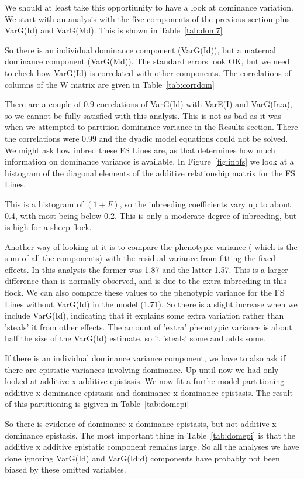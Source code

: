 \documentclass[titlepage]{article}  %
\begin{document}
We should at least take this opportiunity to have a look at dominance variation. We start with an analysis with the five components of the previous section plus VarG(Id) and VarG(Md). This is shown in Table~\ref{tab:dom7}

So there is an individual dominance component (VarG(Id)), but a maternal dominance component (VarG(Md)). The standard errors look OK, but we need to check how VarG(Id) is correlated with other components. The correlations of columns of the W matrix are given in Table~\ref{tab:corrdom}

There are a couple of 0.9 correlations of VarG(Id) with VarE(I) and  VarG(Ia:a), so we cannot be fully satisfied with this analysis. This is not as bad as it was when we attempted to partition dominance variance in the Results section. There the correlations were 0.99 and the dyadic model equations could not be solved.
We might ask how inbred these FS Lines are, as that determines how much information on dominance variance is available. In Figure~\ref{fig:inbfs} we look at a histogram of the diagonal elements of the additive relationship matrix for the FS Lines. 

This is a histogram of $(1 + F)$, so the inbreeding coefficients vary up to about 0.4, with most being below 0.2. This is only a moderate degree of inbreeding, but is high for a sheep flock.

Another way of looking at it is to compare the phenotypic variance ( which is the sum of all the components) with the residual variance from fitting the fixed effects. In this analysis the former was 1.87 and the latter 1.57. This is a larger difference than is normally observed, and is due to the extra inbreeding in this flock. We can also compare these values to the phenotypic variance for the FS Lines without VarG(Id) in the model (1.71). So there is a slight increase when we include VarG(Id), indicating that it explains some extra variation rather than 'steals' it from other effects. The amount of 'extra' phenotypic variance is about half the size of the VarG(Id) estimate, so it 'steals' some and adds some.

If there is an individual dominance variance component, we have to also ask if there are epistatic variances involving dominance. Up until now we had only looked at additive x additive epistasis. We now fit a furthe model partitioning additive x dominance epistasis and dominance x dominance epistasis. The result of this partitioning is gigiven in Table~\ref{tab:domepi}

So there is evidence of dominance x dominance epistasis, but not additive x dominance epistasis. The most important thing in Table~\ref{tab:domepi} is that the additive x additive epistatic component remains large. So all the analyses we have done ignoring VarG(Id) and VarG(Id:d) components have probably not been biased by these omitted variables. 
\end{document}
